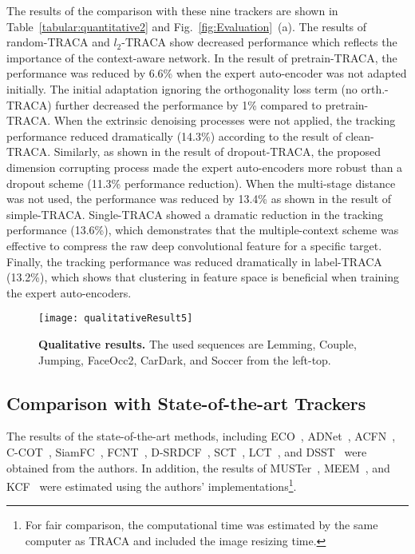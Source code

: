 \documentclass[10pt,twocolumn,letterpaper]{article}
\begin{document}
The results of the comparison with these nine trackers are shown in Table~\ref{tabular:quantitative2} and Fig.~\ref{fig:Evaluation}~(a).
The results of random-TRACA and $l_2$-TRACA show decreased performance which reflects the importance of the context-aware network.
In the result of pretrain-TRACA, the performance was reduced by 6.6\% when the expert auto-encoder was not adapted initially.
The initial adaptation ignoring the orthogonality loss term (no orth.-TRACA) further decreased the performance by 1\% compared to pretrain-TRACA.
When the extrinsic denoising processes were not applied, the tracking performance reduced dramatically (14.3\%) according to the result of clean-TRACA.
Similarly, as shown in the result of dropout-TRACA, the proposed dimension corrupting process made the expert auto-encoders more robust than a dropout scheme (11.3\% performance reduction).
When the multi-stage distance was not used, the performance was reduced by 13.4\% as shown in the result of simple-TRACA.
Single-TRACA showed a dramatic reduction in the tracking performance (13.6\%), which demonstrates that the multiple-context scheme was effective to compress the raw deep convolutional feature for a specific target.
Finally, the tracking performance was reduced dramatically in label-TRACA (13.2\%), which shows that clustering in feature space is beneficial when training the expert auto-encoders.

\begin{figure}[t]
\centering
    \texttt{[image: qualitativeResult5]}
    \caption{ {\bf{Qualitative results.}}  The used sequences are {{Lemming}}, {{Couple}}, {{Jumping}}, {{FaceOcc2}}, {{CarDark}}, and {{Soccer}} from the left-top.}
    \label{fig:Qualitative}    
    \vspace{-4mm}
\end{figure}

\subsection{Comparison with State-of-the-art Trackers}
The results of the state-of-the-art methods, including ECO~\cite{ref:ECO}, ADNet~\cite{ref:yun}, ACFN~\cite{ref:ACFN}, C-COT~\cite{ref:COT}, SiamFC~\cite{ref:SiamFC}, FCNT~\cite{ref:FCNT}, D-SRDCF~\cite{ref:DeepSRDCF}, SCT~\cite{ref:SCT}, LCT~\cite{ref:LongCT}, and DSST~\cite{ref:DSST} were obtained from the authors.
In addition, the results of MUSTer~\cite{ref:MUSTer}, MEEM~\cite{ref:MEEM}, and KCF~\cite{ref:KCF} were estimated using the authors' implementations\footnote{For fair comparison, the computational time was estimated by the same computer as \ac{TRACA} and included the image resizing time.}.
\end{document}
